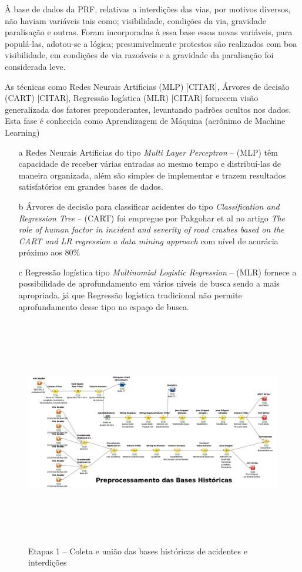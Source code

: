  
À base de dados da PRF, relativas a interdições das vias, por motivos diversos, não haviam variáveis tais como; visibilidade, condições da via, gravidade paralisação e outras.
Foram incorporadas à essa base essas novas variáveis, para populá-las, adotou-se a lógica; presumivelmente protestos são realizados com boa visibilidade, em condições de via razoáveis e a gravidade da paralisação foi considerada leve.

As técnicas como Redes Neurais Artificias (MLP) [\large{CITAR}], Árvores de decisão (CART) [\large{CITAR}], Regressão logística (MLR) 
[\large{CITAR}] fornecem visão generalizada dos fatores preponderantes, levantando padrões ocultos nos dados. Esta fase é conhecida como 
Aprendizagem de Máquina (acrônimo de Machine Learning)

\begin{itemize}
 \item[a] Redes Neurais Artificias do tipo \textit{ Multi Layer Perceptron}  -- (MLP) têm capacidade de receber várias entradas ao mesmo tempo e distribuí-las de maneira organizada, além 
	  são simples de implementar e trazem resultados satisfatórios em grandes bases de dados.
 
 \item[b] Árvores de decisão para classificar acidentes do tipo \textit{ Classification and Regression Tree}  -- (CART) foi empregue por Pakgohar et al no artigo 
	  \textit{The role of human factor in incident and severity of road crashes based on the CART and LR regression a data mining approach}  com nível de acurácia próximo aos 80\%

 \item[c] Regressão logística tipo \textit{Multinomial Logistic Regression} -- (MLR) fornece a possibilidade de aprofundamento em vários níveis de busca sendo a mais apropriada, já que Regressão logística 
	  tradicional não permite aprofundamento desse tipo no espaço de busca.
\end{itemize}



\begin{figure}[ht]
  \centering
    \caption{Etapas 1 -- Coleta e união das bases históricas de acidentes e interdições}
    \includegraphics[width=165mm, height=100mm]{Figuras/Cronograma/BasesHistoricas.png}
\end{figure}

